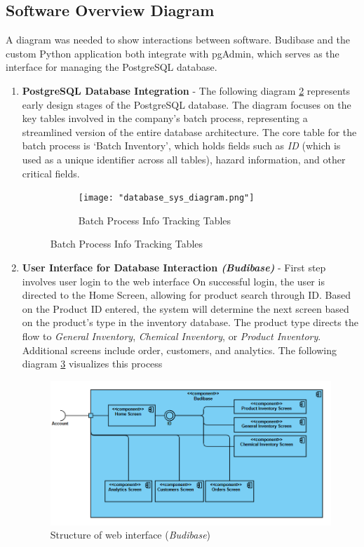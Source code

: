 \documentclass{article}
\begin{document}
\subsection{Software Overview Diagram} 
A diagram was needed to show interactions between software. Budibase and the custom Python application both integrate with pgAdmin,  
which serves as the interface for managing the PostgreSQL database.  
\begin{enumerate} 
    \item \textbf{PostgreSQL Database Integration} -  
    The following diagram \ref{fig:database_diagram} represents early design stages of the PostgreSQL database.  
    The diagram focuses on the key tables involved in the company’s batch process,  
    representing a streamlined version of the entire database architecture. 
    The core table for the batch process is ‘Batch Inventory’, which holds fields such as 
        \textit{ID} (which is used as a unique identifier across all tables),  
    hazard information, and other critical fields. 

    \begin{figure}[h!] 
        \centering 
        \begin{subfigure}[b]{\textwidth} 
        \centering 
        \texttt{[image: "database\_sys\_diagram.png"]} 
        \caption{Batch Process Info Tracking Tables} 
        \label{fig:database_diagram} 
        \end{subfigure} 
    \end{figure} 
        \FloatBarrier

    \item \textbf{User Interface for Database Interaction  \textit{(Budibase)}} - First step involves user login to the web interface 
    On successful login, the user is directed to the Home Screen, allowing for product search through ID.  
    Based on the Product ID entered, the system will determine the next screen based on the product's type in the inventory database.  
    The product type directs the flow to  
    \textit{General Inventory}, \textit{Chemical Inventory}, or \textit{Product Inventory}. 
    Additional screens include order, customers, and analytics. The following diagram \ref{fig:bb_software_diagram}  
    visualizes this process 
        \begin{figure}[h]
        \centering 
        \includegraphics[width=0.5\linewidth]{pictures/bb_diagram2.png} 
            \caption{Structure of web interface (\textit{Budibase})} 
        \label{fig:bb_software_diagram} 
    \end{figure} 
    \FloatBarrier


\end{enumerate}
\end{document}
